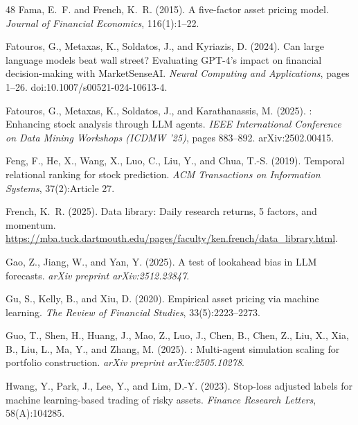 {\begin{thebibliography}{48}
Fama, E.~F. and French, K.~R. (2015).
\newblock A five-factor asset pricing model.
\newblock \emph{Journal of Financial Economics}, 116(1):1--22.

Fatouros, G., Metaxas, K., Soldatos, J., and Kyriazis, D. (2024).
\newblock Can large language models beat wall street? {E}valuating {GPT-4}'s impact on financial decision-making with {MarketSenseAI}.
\newblock \emph{Neural Computing and Applications}, pages 1--26. doi:10.1007/s00521-024-10613-4.

Fatouros, G., Metaxas, K., Soldatos, J., and Karathanassis, M. (2025).
: Enhancing stock analysis through {LLM} agents.
\newblock \emph{IEEE International Conference on Data Mining Workshops (ICDMW '25)}, pages 883--892. arXiv:2502.00415.

Feng, F., He, X., Wang, X., Luo, C., Liu, Y., and Chua, T.-S. (2019).
\newblock Temporal relational ranking for stock prediction.
\newblock \emph{ACM Transactions on Information Systems}, 37(2):Article 27.

French, K.~R. (2025).
\newblock Data library: Daily research returns, 5 factors, and momentum.
\newblock \url{https://mba.tuck.dartmouth.edu/pages/faculty/ken.french/data_library.html}.

Gao, Z., Jiang, W., and Yan, Y. (2025).
\newblock A test of lookahead bias in {LLM} forecasts.
\newblock \emph{arXiv preprint arXiv:2512.23847}.

Gu, S., Kelly, B., and Xiu, D. (2020).
\newblock Empirical asset pricing via machine learning.
\newblock \emph{The Review of Financial Studies}, 33(5):2223--2273.

Guo, T., Shen, H., Huang, J., Mao, Z., Luo, J., Chen, B., Chen, Z., Liu, X., Xia, B., Liu, L., Ma, Y., and Zhang, M. (2025).
: Multi-agent simulation scaling for portfolio construction.
\newblock \emph{arXiv preprint arXiv:2505.10278}.

Hwang, Y., Park, J., Lee, Y., and Lim, D.-Y. (2023).
\newblock Stop-loss adjusted labels for machine learning-based trading of risky assets.
\newblock \emph{Finance Research Letters}, 58(A):104285.


\end{thebibliography}}
